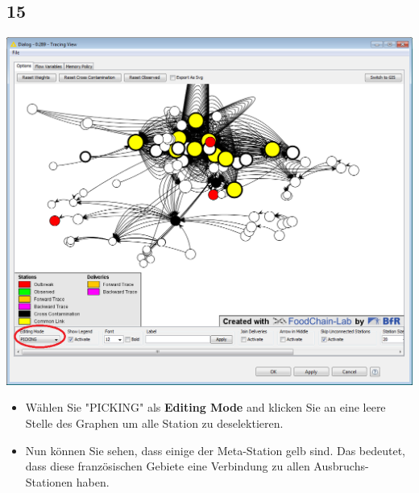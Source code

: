\documentclass{beamer}
\begin{document}
\subsection{15}
\begin{frame}
	\begin{center}
  		\includegraphics[height=0.6\textheight]{15.png}
	\end{center}
	\begin{itemize}
		\item Wählen Sie "PICKING" als \textbf{Editing Mode} and klicken Sie an eine leere Stelle des Graphen um alle Station zu deselektieren.
		\item Nun können Sie sehen, dass einige der Meta-Station gelb sind. Das bedeutet, dass diese französischen Gebiete eine Verbindung zu allen Ausbruchs-Stationen haben.
	\end{itemize}
\end{frame}
\end{document}
